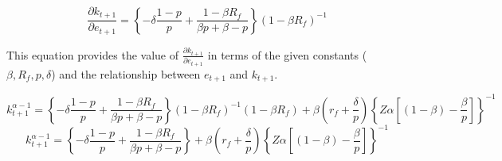 \documentclass{article}
\begin{document}
\[\frac{\partial k_{t+1}}{\partial e_{t+1}} = \left\{-\delta\frac{1-p}{p} + \frac{1 -\beta R_f }{\beta p + \beta - p}
\right \} \left(1-\beta R_f\right)^{-1}\]

This equation provides the value of \(\frac{\partial k_{t+1}}{\partial e_{t+1}}\) in terms of the given constants
(\(\beta, R_f, p, \delta\)) and the relationship between \(e_{t+1}\) and \(k_{t+1}\). 

\[k^{\alpha-1}_{t+1}= \left\{-\delta\frac{1-p}{p} + \frac{1 -\beta R_f }{\beta p + \beta - p}
\right \} \left(1-\beta R_f\right)^{-1} \left(1-\beta R_f\right) + \beta
\left(r_f+\frac{\delta}{p}\right)\left\{Z\alpha\left[\left(1-\beta\right)-\frac{\beta}{p}\right]\right\}^{-1}\] 
\[k^{\alpha-1}_{t+1}= \left\{-\delta\frac{1-p}{p} + \frac{1 -\beta R_f }{\beta p + \beta - p}
\right \} + \beta
\left(r_f+\frac{\delta}{p}\right)\left\{Z\alpha\left[\left(1-\beta\right)-\frac{\beta}{p}\right]\right\}^{-1}\] 
\end{document}
